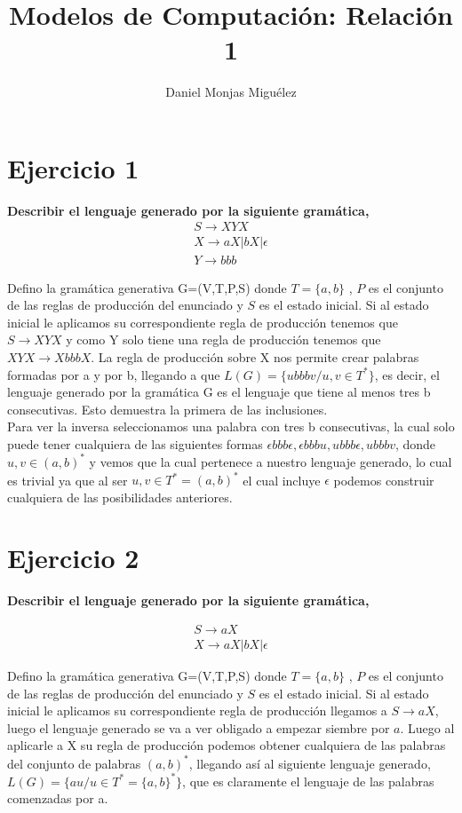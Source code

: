 \documentclass[a4paper,11pt]{article}
\author{Daniel Monjas Miguélez}
\title{Modelos de Computación: Relación 1}
\begin{document}
\maketitle
\newpage
\tableofcontents
\newpage

\section{Ejercicio 1}
\textbf{Describir el lenguaje generado por la siguiente gramática,}
\begin{align*}
S \rightarrow XYX \\ X \rightarrow aX|bX|\epsilon \\ Y \rightarrow bbb
\end{align*}

Defino la gramática generativa G=(V,T,P,S) donde $T=\{a,b\}$ , $P$ es el conjunto de las reglas de producción del enunciado y $S$ es el estado inicial. Si al estado inicial le aplicamos su correspondiente regla de producción tenemos que  $S \rightarrow XYX$ y como Y solo tiene una regla de producción tenemos que $XYX \rightarrow XbbbX$. La regla de producción sobre X nos permite crear palabras formadas por a y por b, llegando a que $L(G) = \{ubbbv / u,v \in T^*\}$, es decir, el lenguaje generado por la gramática G es el lenguaje que tiene al menos tres b consecutivas. Esto demuestra la primera de las inclusiones. \\

Para ver la inversa seleccionamos una palabra con tres b consecutivas, la cual solo puede tener cualquiera de las siguientes formas $\epsilon bbb \epsilon,\epsilon bbb u, u bbb \epsilon, u bbb v$, donde $u,v \in (a,b)^*$ y vemos que la cual pertenece a nuestro lenguaje generado, lo cual es trivial ya que al ser $u,v \in T^*=(a,b)^*$ el cual incluye $\epsilon$ podemos construir cualquiera de las posibilidades anteriores.

\section{Ejercicio 2}
\textbf{Describir el lenguaje generado por la siguiente gramática,}

\begin{align*}
S \rightarrow aX \\ X \rightarrow aX|bX|\epsilon
\end{align*}

Defino la gramática generativa G=(V,T,P,S) donde $T=\{a,b\}$ , $P$ es el conjunto de las reglas de producción del enunciado y $S$ es el estado inicial. Si al estado inicial le aplicamos su correspondiente regla de producción llegamos a $S\rightarrow aX$, luego el lenguaje generado se va a ver obligado a empezar siembre por $a$. Luego al aplicarle a X su regla de producción podemos obtener cualquiera de las palabras del conjunto de palabras $(a,b)^*$, llegando así al siguiente lenguaje generado, $L(G)=\{au / u\in T^*=\{a,b\}^*\}$, que es claramente el lenguaje de las palabras comenzadas por a.\\
\end{document}
